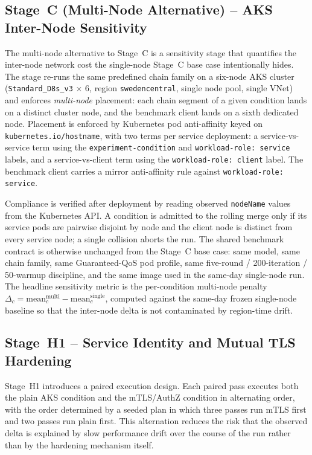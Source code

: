 \subsection{Stage~C (Multi-Node Alternative) -- AKS Inter-Node Sensitivity}
\label{sec:methods-rq15b}

The multi-node alternative to Stage~C is a sensitivity stage that quantifies the inter-node
network cost the single-node Stage~C base case intentionally hides.
The stage re-runs the same predefined chain family on a six-node AKS cluster
(\texttt{Standard\_D8s\_v3} $\times$ 6, region \texttt{swedencentral}, single node pool,
single VNet) and enforces \emph{multi-node} placement: each chain segment of a given
condition lands on a distinct cluster node, and the benchmark client lands on a sixth
dedicated node.
Placement is enforced by Kubernetes pod anti-affinity keyed on
\texttt{kubernetes.io/hostname}, with two terms per service deployment: a service-vs-service
term using the \texttt{experiment-condition} and \texttt{workload-role: service} labels, and
a service-vs-client term using the \texttt{workload-role: client} label.
The benchmark client carries a mirror anti-affinity rule against
\texttt{workload-role: service}.

Compliance is verified after deployment by reading observed \texttt{nodeName} values
from the Kubernetes API.
A condition is admitted to the rolling merge only if its service pods are pairwise
disjoint by node and the client node is distinct from every service node; a single
collision aborts the run.
The shared benchmark contract is otherwise unchanged from the Stage~C base case: same model,
same chain family, same Guaranteed-QoS pod profile, same five-round / 200-iteration /
50-warmup discipline, and the same image used in the same-day single-node run.
The headline sensitivity metric is the per-condition multi-node penalty
$\Delta_c = \mathrm{mean}_c^{\mathrm{multi}} - \mathrm{mean}_c^{\mathrm{single}}$,
computed against the same-day frozen single-node baseline so that the inter-node
delta is not contaminated by region-time drift.

\subsection{Stage~H1 -- Service Identity and Mutual TLS Hardening}
\label{sec:methods-rq21}

Stage~H1 introduces a paired execution design.
Each paired pass executes both the plain AKS condition and the mTLS/AuthZ condition in
alternating order, with the order determined by a seeded plan in which three passes run
mTLS first and two passes run plain first.
This alternation reduces the risk that the observed delta is explained by slow
performance drift over the course of the run rather than by the hardening mechanism
itself.

